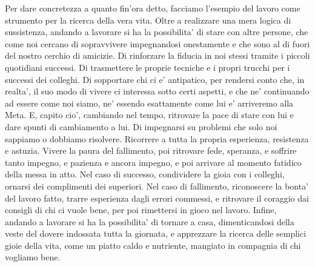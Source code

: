 Per dare concretezza a quanto fin'ora detto, facciamo l'esempio del lavoro come strumento per la ricerca della vera vita. Oltre a realizzare una mera logica di sussistenza, andando a lavorare si ha la possibilita' di stare con altre persone, che come noi cercano di sopravvivere impegnandosi onestamente e che sono al di fuori del nostro cerchio di amicizie. Di rinforzare la fiducia in noi stessi tramite i piccoli quotidiani successi. Di trasmettere le proprie tecniche e i propri trucchi per i successi dei colleghi. Di sopportare chi ci e' antipatico, per rendersi conto che, in realta', il suo modo di vivere ci interessa sotto certi aspetti, e che ne' continuando ad essere come noi siamo, ne' essendo esattamente come lui e' arriveremo alla Meta. E, capito cio', cambiando nel tempo, ritrovare la pace di stare con lui e dare spunti di cambiamento a lui. Di impegnarsi su problemi che solo noi sappiamo o dobbiamo risolvere. Ricorrere a tutta la propria esperienza, resistenza e astuzia. Vivere la paura del fallimento, poi ritrovare fede, speranza, e soffrire tanto impegno, e pazienza e ancora impegno, e poi arrivare al momento fatidico della messa in atto. Nel caso di successo, condividere la gioia con i colleghi, ornarsi dei complimenti dei superiori. Nel caso di fallimento, riconoscere la bonta' del lavoro fatto, trarre esperienza dagli errori commessi, e ritrovare il coraggio dai consigli di chi ci vuole bene, per poi rimettersi in gioco nel lavoro.  Infine, andando a lavorare si ha la possibilita' di tornare a casa, dimenticandosi della veste del dovere indossata tutta la giornata, e apprezzare la ricerca delle semplici gioie della vita, come un piatto caldo e nutriente, mangiato in compagnia di chi vogliamo bene.

